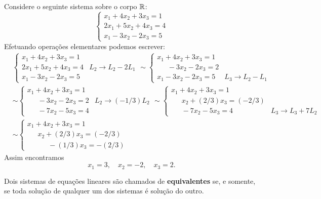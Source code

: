\begin{exemplo}
Considere o seguinte sistema sobre o corpo $\mathbb{R}$:
\[
\begin{cases}
x_1 + 4x_2 + 3x_3 = 1\\
2x_1 + 5x_2 + 4x_3 = 4\\
x_1 - 3x_2 - 2x_3 = 5
\end{cases}
\]
Efetuando opera\c{c}\~oes elementares podemos escrever:
\begin{align*}
&\begin{cases}
x_1 + 4x_2 + 3x_3 = 1\\
2x_1 + 5x_2 + 4x_3 = 4 & L_2 \rightarrow L_2 - 2L_1\\
x_1 - 3x_2 - 2x_3 = 5
\end{cases} \sim
\begin{cases}
x_1 + 4x_2 + 3x_3 = 1\\
\phantom{0x_1} -3x_2 - 2x_3 = 2\\
x_1 - 3x_2 - 2x_3 = 5 & L_3 \rightarrow L_2 - L_1
\end{cases}\\ & \sim
\begin{cases}
x_1 + 4x_2 + 3x_3 = 1\\
\phantom{0x_1} - 3x_2 - 2x_3 = 2 & L_2 \rightarrow (-1/3)L_2\\
\phantom{0x_1} - 7x_2 - 5x_3 = 4
\end{cases} \sim
\begin{cases}
x_1 + 4x_2 + 3x_3 = 1\\
\phantom{0x_1} x_2 + (2/3)x_3 = (-2/3)\\
\phantom{0x_1} - 7x_2 - 5x_3 = 4 & L_3 \rightarrow L_3 + 7L_2
\end{cases}\\ & \sim
\begin{cases}
x_1 + 4x_2 + 3x_3 = 1\\
\phantom{0x_1} x_2 + (2/3)x_3 = (-2/3)\\
\phantom{0x_1} \phantom{0x_2}  -(1/3)x_3 = -(2/3)
\end{cases}
\end{align*}
Assim encontramos
\[
x_1 = 3, \quad x_2 = -2, \quad x_3 = 2.
\]
\end{exemplo}

\begin{definicao}
Dois sistemas de equa\c{c}\~oes lineares s\~ao chamados de \textbf{equivalentes} se, e somente, se toda solu\c{c}\~ao de qualquer um dos sistemas \'e solu\c{c}\~ao do outro.
\end{definicao}

